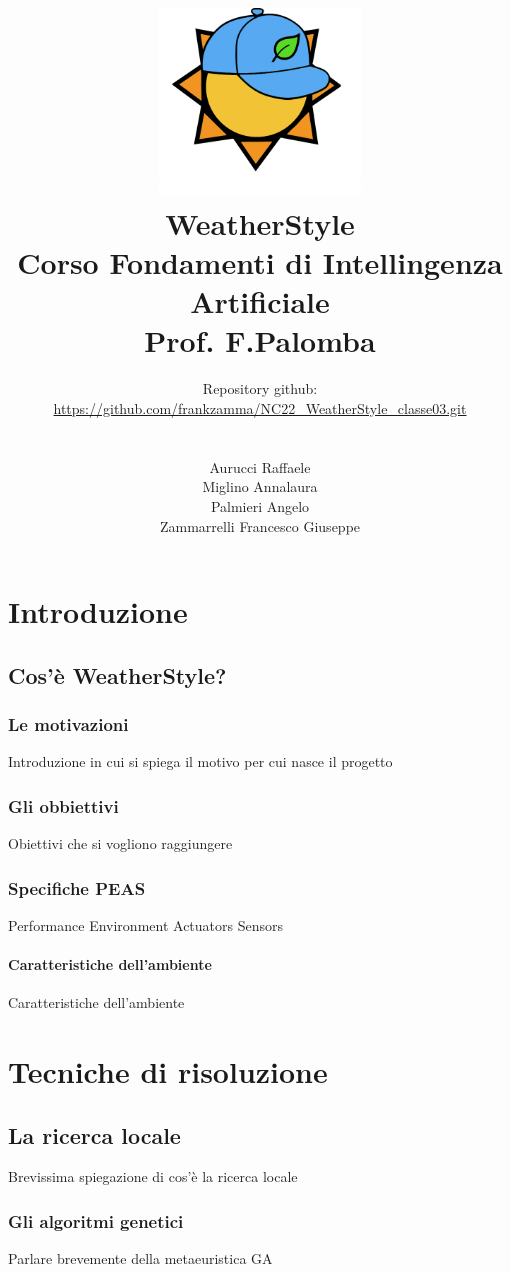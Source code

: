 \documentclass[a4paper, 11pt, oneside]{report}
\title{\includegraphics[width=0.4\textwidth]{logo}\\WeatherStyle\\Corso Fondamenti di Intellingenza Artificiale\\Prof. F.Palomba}
\author{Repository github:\\\url{https://github.com/frankzamma/NC22_WeatherStyle_classe03.git}\\\\
        \\Aurucci Raffaele\\Miglino Annalaura\\Palmieri Angelo\\Zammarrelli Francesco Giuseppe}
\date{}
\begin{document}
    \begin{titlepage}
        \maketitle
    \end{titlepage}

    \tableofcontents

    \part{Introduzione}
        \chapter{Cos'è WeatherStyle?}

            \section{Le motivazioni}
            Introduzione in cui si spiega il motivo per cui nasce il progetto

            \section{Gli obbiettivi}
            Obiettivi che si vogliono raggiungere

            \section{Specifiche PEAS}
            Performance Environment Actuators Sensors

            \subsection{Caratteristiche dell'ambiente}
            Caratteristiche dell'ambiente

    \part{Tecniche di risoluzione}
        \chapter{La ricerca locale}
        Brevissima spiegazione di cos'è la ricerca locale

            \section{Gli algoritmi genetici}
            Parlare brevemente della metaeuristica GA
\end{document}

